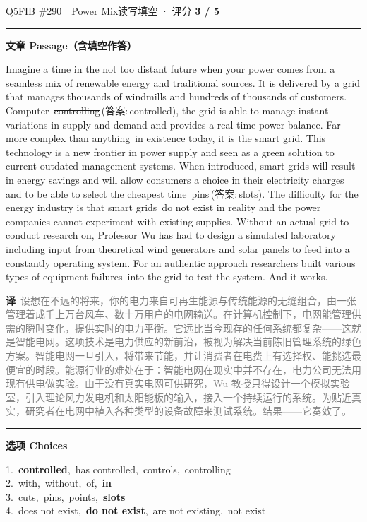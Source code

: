 \documentclass[11pt]{article}
\newcommand{\ptesub}[1]{%
  \par\needspace{2\baselineskip}\smallskip
  {\color{cAccent}\rule[-0.2ex]{3pt}{1.05em}}\hspace{6pt}%
  {\bfseries\color{cHead}#1}\par\nopagebreak\smallskip}
\newcommand{\zh}[1]{{\footnotesize\textcolor{cNote}{\textbf{译}}\ \textcolor{gray}{#1}}}
\newcommand{\rok}[1]{{\color{cFix}\ding{51}\,#1}}                 %
\newcommand{\rno}[2]{{\color{cWrong}\ding{55}\,\sout{#1}}\,{\footnotesize\color{cFix}(答案:\,#2)}}  %
\begin{document}
\begin{qblock}{Q5\quad FIB \#290\ \ Power Mix}{读写填空 · 评分 \textcolor{cAccent}{\bfseries 3 / 5}}
\ptesub{文章 Passage（含填空作答）}
\begin{promptbox}
Imagine a time in the not too distant future when your power comes from a seamless mix of renewable energy and traditional sources. It is delivered by a grid that manages thousands of windmills and hundreds of thousands of customers. Computer \rno{controlling}{controlled}, the grid is able to manage instant variations in supply and demand and provides a real time power balance. Far more complex than anything \rok{in} existence today, it is the smart grid. This technology is a new frontier in power supply and seen as a green solution to current outdated management systems. When introduced, smart grids will result in energy savings and will allow consumers a choice in their electricity charges and to be able to select the cheapest time \rno{pins}{slots}. The difficulty for the energy industry is that smart grids \rok{do not exist} in reality and the power companies cannot experiment with existing supplies. Without an actual grid to conduct research on, Professor Wu has had to design a simulated laboratory including input from theoretical wind generators and solar panels to feed into a constantly operating system. For an authentic approach researchers built various types of equipment failures \rok{into} the grid to test the system. And it works.
\end{promptbox}
\zh{设想在不远的将来，你的电力来自可再生能源与传统能源的无缝组合，由一张管理着成千上万台风车、数十万用户的电网输送。在计算机控制下，电网能管理供需的瞬时变化，提供实时的电力平衡。它远比当今现存的任何系统都复杂——这就是智能电网。这项技术是电力供应的新前沿，被视为解决当前陈旧管理系统的绿色方案。智能电网一旦引入，将带来节能，并让消费者在电费上有选择权、能挑选最便宜的时段。能源行业的难处在于：智能电网在现实中并不存在，电力公司无法用现有供电做实验。由于没有真实电网可供研究，Wu 教授只得设计一个模拟实验室，引入理论风力发电机和太阳能板的输入，接入一个持续运行的系统。为贴近真实，研究者在电网中植入各种类型的设备故障来测试系统。结果——它奏效了。}
\ptesub{选项 Choices}
{\small
1.\ \textbf{controlled},\ has controlled,\ controls,\ controlling\\
2.\ with,\ without,\ of,\ \textbf{in}\\
3.\ cuts,\ pins,\ points,\ \textbf{slots}\\
4.\ does not exist,\ \textbf{do not exist},\ are not existing,\ not exist\\
}
\end{qblock}
\end{document}
